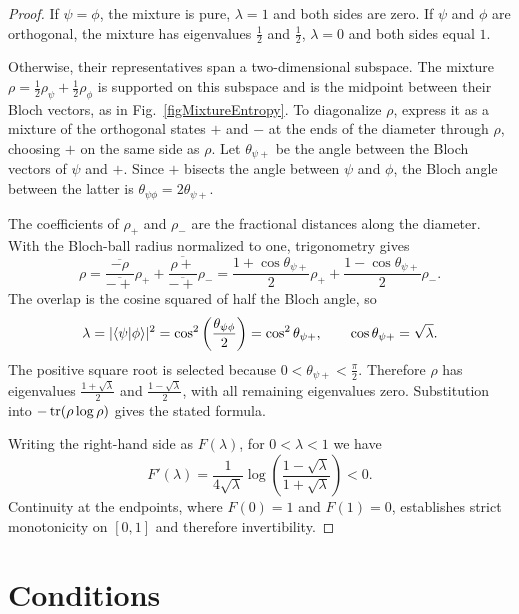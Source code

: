 \documentclass{techbrief}
\begin{document}
\begin{proof}
	If $\psi=\phi$, the mixture is pure, $\lambda=1$ and both sides are zero. If $\psi$ and $\phi$ are orthogonal, the mixture has eigenvalues $\frac{1}{2}$ and $\frac{1}{2}$, $\lambda=0$ and both sides equal $1$.

	Otherwise, their representatives span a two-dimensional subspace. The mixture $\rho=\frac{1}{2}\rho_\psi+\frac{1}{2}\rho_\phi$ is supported on this subspace and is the midpoint between their Bloch vectors, as in Fig.~\ref{figMixtureEntropy}. To diagonalize $\rho$, express it as a mixture of the orthogonal states $+$ and $-$ at the ends of the diameter through $\rho$, choosing $+$ on the same side as $\rho$. Let $\theta_{\psi+}$ be the angle between the Bloch vectors of $\psi$ and $+$. Since $+$ bisects the angle between $\psi$ and $\phi$, the Bloch angle between the latter is $\theta_{\psi\phi}=2\theta_{\psi+}$.

	The coefficients of $\rho_+$ and $\rho_-$ are the fractional distances along the diameter. With the Bloch-ball radius normalized to one, trigonometry gives
	\begin{equation*}
		\rho=\frac{\overline{-\rho}}{\overline{-+}}\rho_++\frac{\overline{\rho+}}{\overline{-+}}\rho_-=\frac{1+\cos\theta_{\psi+}}{2}\rho_++\frac{1-\cos\theta_{\psi+}}{2}\rho_-.
	\end{equation*}
	The overlap is the cosine squared of half the Bloch angle, so
	\begin{equation*}
		\lambda=|\langle\psi|\phi\rangle|^2=\cos^2\left(\frac{\theta_{\psi\phi}}{2}\right)=\cos^2\theta_{\psi+},\qquad \cos\theta_{\psi+}=\sqrt{\lambda}.
	\end{equation*}
	The positive square root is selected because $0<\theta_{\psi+}<\frac{\pi}{2}$. Therefore $\rho$ has eigenvalues $\frac{1+\sqrt{\lambda}}{2}$ and $\frac{1-\sqrt{\lambda}}{2}$, with all remaining eigenvalues zero. Substitution into $-\operatorname{tr}(\rho\log\rho)$ gives the stated formula.

	Writing the right-hand side as $F(\lambda)$, for $0<\lambda<1$ we have
	\begin{equation*}
		F'(\lambda)=\frac{1}{4\sqrt{\lambda}}\log\left(\frac{1-\sqrt{\lambda}}{1+\sqrt{\lambda}}\right)<0.
	\end{equation*}
	Continuity at the endpoints, where $F(0)=1$ and $F(1)=0$, establishes strict monotonicity on $[0,1]$ and therefore invertibility.
\end{proof}

\section{Conditions}
\end{document}
